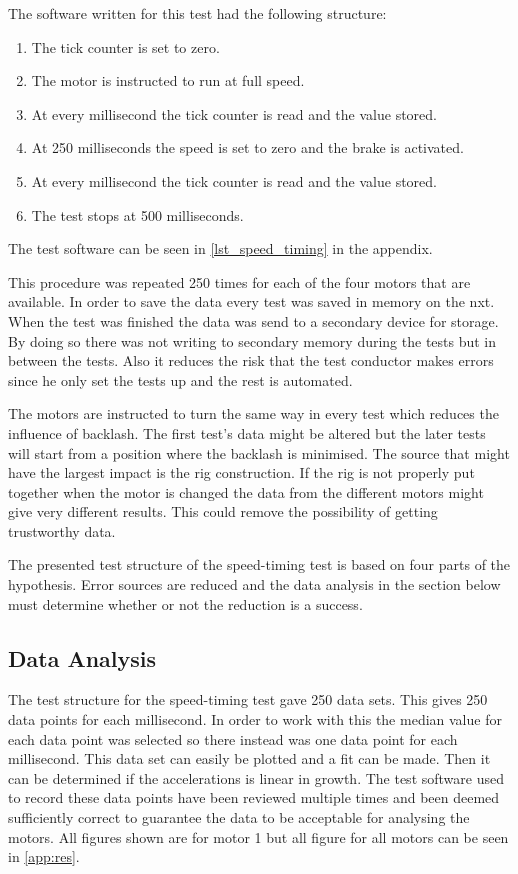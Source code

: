 The software written for this test had the following structure:
\begin{enumerate}
	\item The tick counter is set to zero.
    \item The motor is instructed to run at full speed.
    \item At every millisecond the tick counter is read and the value stored.
    \item At 250 milliseconds the speed is set to zero and the brake is activated.
    \item At every millisecond the tick counter is read and the value stored.
    \item The test stops at 500 milliseconds.
\end{enumerate}
The test software can be seen in \cref{lst_speed_timing} in the appendix.

This procedure was repeated 250 times for each of the four motors that are available. In order to save the data every test was saved in memory on the \gls{nxt}. When the test was finished the data was send to a secondary device for storage. By doing so there was not writing to secondary memory during the tests but in between the tests. Also it reduces the risk that the test conductor makes errors since he only set the tests up and the rest is automated.

The motors are instructed to turn the same way in every test which reduces the influence of backlash. The first test's data might be altered  but the later tests will start from a position where the backlash is minimised. The source that might have the largest impact is the rig construction. If the rig is not properly put together when the motor is changed the data from the different motors might give very different results. This could remove the possibility of getting trustworthy data.

The presented test structure of the speed-timing test is based on four parts of the hypothesis. Error sources are reduced and the data analysis in the section below must determine whether or not the reduction is a success.

\subsection{Data Analysis}\label{ss:data_anal}
The test structure for the speed-timing test gave 250 data sets. This gives 250 data points for each millisecond. In order to work with this the median value for each data point was selected so there instead was one data point for each millisecond. This data set can easily be plotted and a fit can be made.  Then it can be determined if the accelerations is linear in growth. The test software used to record these data points have been reviewed multiple times and been deemed sufficiently correct to guarantee the data to be acceptable for analysing the motors. All figures shown are for motor 1 but all figure for all motors can be seen in \cref{app:res}.

